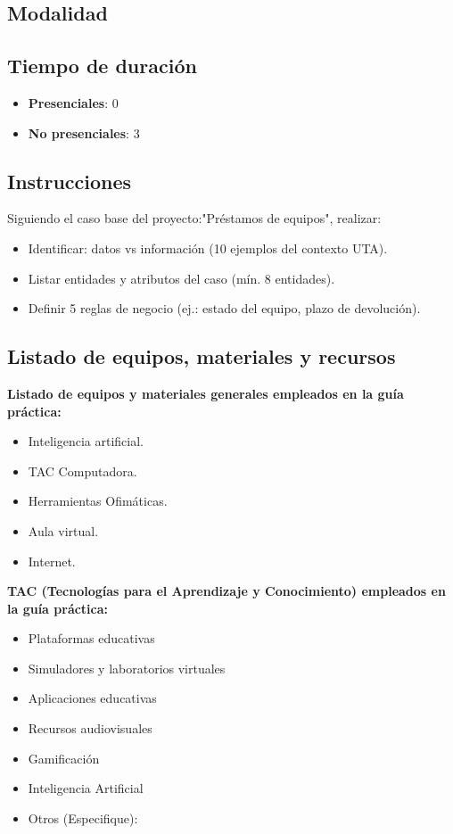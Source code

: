 \documentclass{article}
\begin{document}
\subsection{Modalidad}

\subsection{Tiempo de duración}
\begin{itemize}
    \item \textbf{Presenciales}: 0
    \item \textbf{No presenciales}: 3
\end{itemize}
\subsection{Instrucciones}
Siguiendo el caso base del proyecto:"Préstamos de equipos", realizar:
\begin{itemize}
    \item Identificar: datos vs información (10 ejemplos del contexto UTA).
    \item Listar entidades y atributos del caso (mín. 8 entidades).
    \item Definir 5 reglas de negocio (ej.: estado del equipo, plazo de devolución).
\end{itemize}
\subsection{Listado de equipos, materiales y recursos}
\textbf{Listado de equipos y materiales generales empleados en la guía práctica:}
\begin{itemize}
    \item  Inteligencia artificial.
    \item TAC Computadora.
    \item Herramientas Ofimáticas.
    \item Aula virtual.
    \item Internet. 
\end{itemize}

\textbf{TAC (Tecnologías para el Aprendizaje y Conocimiento) empleados en la guía práctica:}
\begin{itemize}
    \item[$\checkmark$] Plataformas educativas
    \item[$\square$] Simuladores y laboratorios virtuales
    \item[$\checkmark$] Aplicaciones educativas
    \item[$\square$] Recursos audiovisuales
    \item[$\square$] Gamificación
    \item[$\checkmark$] Inteligencia Artificial
    \item Otros (Especifique): \underline{\hspace{5cm}}
\end{itemize}
\end{document}
